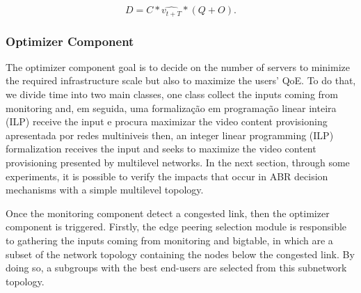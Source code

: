 $$
D = C * \widehat{v_{t+T}} * (Q + O).
$$

\subsubsection*{Optimizer Component}

The optimizer component goal is to decide on the number of servers to minimize the required infrastructure scale but also to maximize the users' QoE. To do that, we divide time into two main classes, one class collect the inputs coming from monitoring and, em seguida, uma formalização em programação linear inteira (ILP) receive the input e procura maximizar the video content provisioning apresentada por redes multiniveis then, an integer linear programming (ILP) formalization receives the input and seeks to maximize the video content provisioning presented by multilevel networks. In the next section, through some experiments, it is possible to verify the impacts that occur in ABR decision mechanisms with a simple multilevel topology.

Once the monitoring component detect a congested link, then the optimizer component is triggered. Firstly, the edge peering selection module is responsible to gathering the inputs coming from monitoring and bigtable, in which are a subset of the network topology containing the nodes below the congested link. By doing so, a subgroups with the best end-users are selected from this subnetwork topology. 

